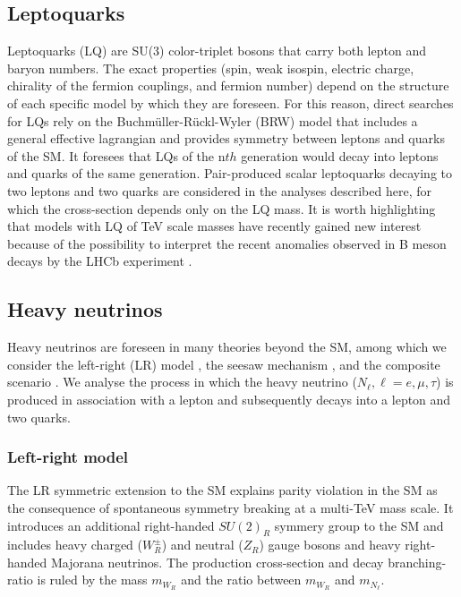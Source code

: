 \documentclass[10pt]{article}
\begin{document}
\vspace{-0.25cm}
\subsection{Leptoquarks}
\vspace{-0.15cm}
Leptoquarks (LQ) are SU(3) color-triplet bosons that carry both lepton and baryon numbers.
The exact properties (spin, weak isospin, electric charge, chirality of the fermion couplings, and fermion number) depend
on the structure of each specific model by which they are foreseen. For this reason, direct searches for LQs %
rely on the Buchm\"{u}ller-R\"{u}ckl-Wyler (BRW) model \cite{BRW} that includes a general effective lagrangian %
and provides symmetry between leptons and quarks of the SM. %
It foresees that LQs of the n$th$ generation would decay into leptons and quarks of the same generation. %
Pair-produced scalar leptoquarks decaying to two leptons and two quarks 
are considered in the analyses described here, for which the cross-section depends only on the LQ mass.
It is worth highlighting that models with LQ of TeV scale masses have recently gained new interest because of
the possibility to interpret the recent anomalies observed in B meson decays by the LHCb experiment \cite{LQLHCb}.

\vspace{-0.25cm}
\subsection{Heavy neutrinos}
\vspace{-0.15cm}
Heavy neutrinos are foreseen in many theories beyond the SM, among which we consider the left-right (LR) model \cite{lr3}, the seesaw mechanism \cite{SeeSaw}, and the composite scenario \cite{HCMNpheno}.
We analyse the process in which the heavy neutrino ($N_{\ell}, \ell = e, \mu, \tau$) is produced in association with a lepton and subsequently decays into a lepton and two quarks. 

\vspace{-0.25cm}
\subsubsection{Left-right model}
\vspace{-0.15cm}
The LR symmetric extension to the SM explains parity violation in the SM as the consequence of spontaneous symmetry breaking at a multi-TeV mass scale. 
It introduces an additional right-handed $SU(2)_{R}$ symmery group to the SM and includes heavy charged ($W_{R}^{\pm}$) and neutral ($Z_{R}$) gauge bosons
and heavy right-handed Majorana neutrinos.
The production cross-section and decay branching-ratio is ruled by the mass $m_{W_{R}}$ and the ratio between $m_{W_{R}}$ and $m_{N_{\ell}}$.
\end{document}
